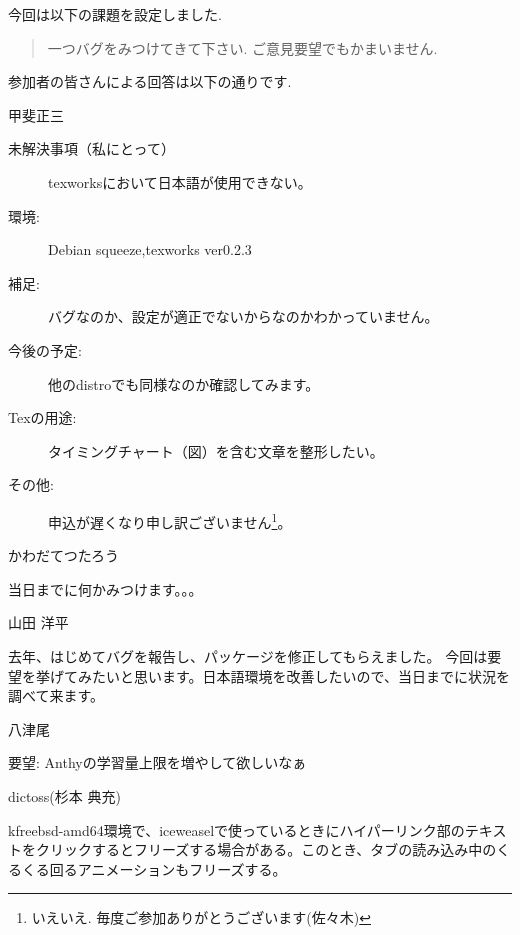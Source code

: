 \documentclass[mingoth,a4paper]{jsarticle}
\begin{document}
\clearpage
{}

今回は以下の課題を設定しました.
%
\begin{quote}
    \begin{screen}
一つバグをみつけてきて下さい. ご意見要望でもかまいません.
    \end{screen}
\end{quote}
%
参加者の皆さんによる回答は以下の通りです.

\begin{prework}{ 甲斐正三 }
  \begin{description}
  \item [未解決事項（私にとって）]
    texworksにおいて日本語が使用できない。
  \item [環境:]
    Debian squeeze,texworks ver0.2.3
  \item [補足:]
    バグなのか、設定が適正でないからなのかわかっていません。
  \item [今後の予定:]
    他のdistroでも同様なのか確認してみます。
  \item [Texの用途:]
    タイミングチャート（図）を含む文章を整形したい。
  \item [その他:]
    申込が遅くなり申し訳ございません\footnote{いえいえ. 毎度ご参加ありがとうございます(佐々木)}。
  \end{description}
\end{prework}

\begin{prework}{ かわだてつたろう }

当日までに何かみつけます。。。

\end{prework}

\begin{prework}{ 山田 洋平 }

去年、はじめてバグを報告し、パッケージを修正してもらえました。
今回は要望を挙げてみたいと思います。日本語環境を改善したいので、当日までに状況を調べて来ます。

\end{prework}

\begin{prework}{ 八津尾 }

要望: Anthyの学習量上限を増やして欲しいなぁ

\end{prework}

\begin{prework}{ dictoss(杉本 典充) }

kfreebsd-amd64環境で、iceweaselで使っているときにハイパーリンク部のテキストをクリックするとフリーズする場合がある。このとき、タブの読み込み中のくるくる回るアニメーションもフリーズする。
\end{prework}
\end{document}

